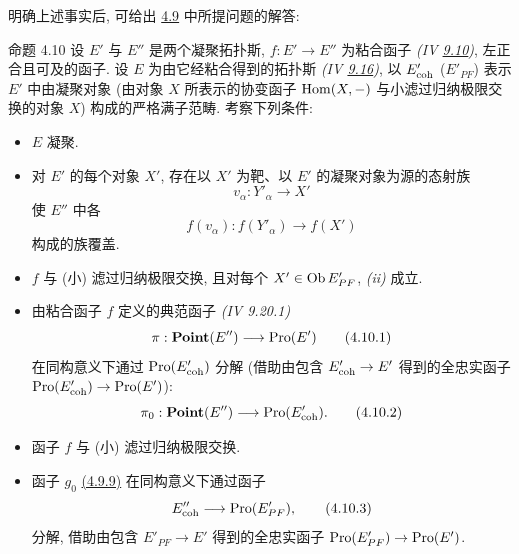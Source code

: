 明确上述事实后, 可给出 \hyperref[VI.subsec4.9]{4.9} 中所提问题的解答:

\begin{enonce*}{命题 4.10}
设 $E'$ 与 $E''$\pageoriginale{} 是两个凝聚拓扑斯,
$f:E'\to E''$ 为粘合函子
\emph{(IV \hyperref[IV.eq9.3.6.3]{9.10})},
\ie 左正合且可及的函子.
设 $E$ 为由它经粘合得到的拓扑斯
\emph{(IV \hyperref[IV.theo9.5.4]{9.16})},
以 $E'_{\mathrm{coh}}$ (\resp $E'_{PF}$)
表示 $E'$ 中由凝聚对象
(\resp 由对象 $X$ 所表示的协变函子 $\operatorname{Hom}(X,-)$
与小滤过归纳极限交换的对象 $X$)
构成的严格满子范畴.
考察下列条件:
\begin{itemize}
\item[(i)] $E$ 凝聚.

\item[(ii)] 对 $E'$ 的每个对象 $X'$,
存在以 $X'$ 为靶、以 $E'$ 的凝聚对象为源的态射族
$$
v_{\alpha} : Y'_{\alpha} \to X'
$$
使 $E''$ 中各
$$
f(v_{\alpha}) : f(Y'_{\alpha}) \to f(X')
$$
构成的族覆盖.

\item[(ii bis)] $f$ 与 (小) 滤过归纳极限交换,
且对每个 $X'\in\operatorname{Ob} E'_{PF}$, \emph{(ii)} 成立.

\item[(ii ter)] 由粘合函子 $f$ 定义的典范函子
\emph{(IV 9.20.1)}
\begin{equation*}
\pi : \Ppoint(E'') \to \Pro(E')\tag{4.10.1}
\end{equation*}
在同构意义下通过 $\operatorname{Pro}(E'_{\mathrm{coh}})$ 分解
(借助由包含 $E'_{\coh}\to E'$ 得到的全忠实函子
$\Pro(E'_{\coh})\to\Pro(E')$):
\begin{equation*}
\pi_0 : \Ppoint (E'') \to \Pro(E'_{\coh}){\quoi}.\tag{4.10.2}
\end{equation*}

\item[(iii)] 函子\pageoriginale{} $f$ 与 (小) 滤过归纳极限交换.

\item[(iii bis)] 函子 $g_0$
\hyperlink{sga4.exp.VI.equation.4.9.9}{(4.9.9)}
在同构意义下通过函子
\begin{equation*}
E''_{\coh} \to \Pro(E'_{PF}){\quoi},\tag{4.10.3}
\end{equation*}
分解, 借助由包含 $E'_{PF}\to E'$ 得到的全忠实函子
$\Pro(E'_{PF})\to\Pro(E')$.


\end{itemize}
\end{enonce*}
